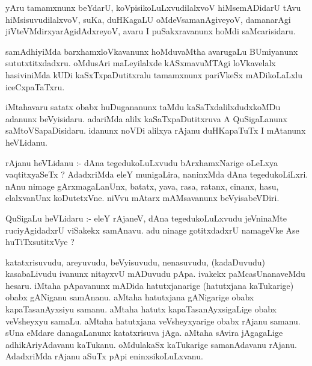 \documentclass{article}
\begin{document}
\begin{mn}
yAru  tamamxnunx  beYdarU,  koVpisikoLuLxvudilalxvoV  hiMsemADidarU  
tAvu  hiMsisuvudilalxvoV,  suKa,  duHKagaLU  oMdeVsamanAgiveyoV,  damanarAgi  
jiVteVMdirxyarAgidAdxreyoV,  avaru  I  puSakxravanunx  hoMdi  saMcarisidaru.
\end{mn}

\begin{mn}
samAdhiyiMda  barxhamxloVkavanunx  hoMduvaMtha  avarugaLu  BUmiyanunx  
sututxtitxdadxru.  oMdusAri  maLeyilalxde  kASxmavuMTAgi  loVkavelalx  hasiviniMda  
kUDi  kaSxTxpaDutitxralu  tamamxnunx  pariVkeSx  mADikoLaLxlu  iceCxpaTaTxru.
\end{mn}

\begin{mn}
iMtahavaru  satatx  obabx  huDugananunx  taMdu  kaSaTxdalilxdudxkoMDu  adanunx  
beVyisidaru.  adariMda  alilx  kaSaTxpaDutitxruva  A  QuSigaLanunx  saMtoVSapaDisidaru.  
idanunx  noVDi  alilxya  rAjanu  duHKapaTuTx  I  mAtanunx  heVLidanu.
\end{mn}

\begin{mn}
rAjanu  heVLidanu :- dAna  tegedukoLuLxvudu  bArxhamxNarige oLeLxya  vaqtitxyaSeTx ?  
AdadxriMda  eleY  munigaLira,  naninxMda  dAna  tegedukoLiLxri.  nAnu  nimage  
gArxmagaLanUnx,  batatx,  yava,  rasa,  ratanx,  cinanx,  hasu,  elalxvanUnx  
koDutetxVne.  niVvu  mAtarx  mAMsavanunx beVyisabeVDiri.
\end{mn}

\begin{mn}
QuSigaLu  heVLidaru :- eleY  rAjaneV,  dAna  tegedukoLuLxvudu  jeVninaMte  ruciyAgidadxrU  
viSakekx  samAnavu.  adu  ninage  gotitxdadxrU  namageVke  Ase  huTiTxsutitxVye ?
\end{mn}

\begin{mn}
katatxrisuvudu,  areyuvudu,  beVyisuvudu,  nenasuvudu, (kadaDuvudu) kasabaLivudu  
ivanunx  nitayxvU  mADuvudu  pApa.  ivakekx  paMcasUnanaveMdu  hesaru.  iMtaha  
pApavanunx  mADida  hatutxjanarige (hatutxjana  kaTukarige) obabx  gANiganu  
samAnanu.  aMtaha  hatutxjana  gANigarige  obabx  kapaTasanAyxsiyu  samanu.  
aMtaha  hatutx  kapaTasanAyxsigaLige  obabx  veVsheyxyu  samaLu.  aMtaha  
hatutxjana  veVsheyxyarige  obabx  rAjanu  samanu.  sUna  eMdare  danagaLanunx  
katatxrisuva  jAga.  aMtaha  sAvira  jAgagaLige  adhikAriyAdavanu  kaTukanu.  oMdulakaSx  
kaTukarige  samanAdavanu  rAjanu.  AdadxriMda  rAjanu  aSuTx  pApi  eninxsikoLuLxvanu.
\end{mn}
\end{document}

